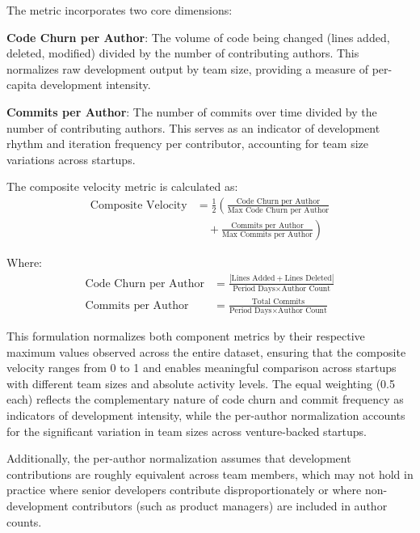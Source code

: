 The metric incorporates two core dimensions:

\textbf{Code Churn per Author}: The volume of code being changed (lines added, deleted, modified) divided by the number of contributing authors. This normalizes raw development output by team size, providing a measure of per-capita development intensity.

\textbf{Commits per Author}: The number of commits over time divided by the number of contributing authors. This serves as an indicator of development rhythm and iteration frequency per contributor, accounting for team size variations across startups.

The composite velocity metric is calculated as:
\begin{equation}
\begin{aligned}
\text{Composite Velocity} &= \frac{1}{2} \left( \frac{\text{Code Churn per Author}}{\text{Max Code Churn per Author}} \right. \\
&\quad + \left. \frac{\text{Commits per Author}}{\text{Max Commits per Author}} \right)
\end{aligned}
\label{eq:composite-velocity}
\end{equation}

Where:
\begin{align*}
\text{Code Churn per Author} &= \frac{|\text{Lines Added} + \text{Lines Deleted}|}{\text{Period Days} \times \text{Author Count}} \\
\text{Commits per Author} &= \frac{\text{Total Commits}}{\text{Period Days} \times \text{Author Count}}
\end{align*}

This formulation normalizes both component metrics by their respective maximum values observed across the entire dataset, ensuring that the composite velocity ranges from 0 to 1 and enables meaningful comparison across startups with different team sizes and absolute activity levels. The equal weighting (0.5 each) reflects the complementary nature of code churn and commit frequency as indicators of development intensity, while the per-author normalization accounts for the significant variation in team sizes across venture-backed startups.

Additionally, the per-author normalization assumes that development contributions are roughly equivalent across team members, which may not hold in practice where senior developers contribute disproportionately or where non-development contributors (such as product managers) are included in author counts.

